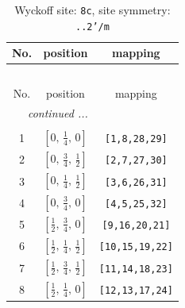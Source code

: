 \documentclass[fleqn,8pt]{jsarticle}
\begin{document}
\begin{longtable}{ccc}
\caption{Wyckoff site: {\tt 8c}, site symmetry: {\tt ..2'/m}}
 \\
 \hline \hline
No. & position & mapping \\ \hline \endfirsthead

\multicolumn{2}{l}{\tablename\ \thetable{}} \\
 \hline \hline
No. & position & mapping \\ \hline \endhead

 \hline \hline
\multicolumn{2}{r}{\footnotesize\it continued ...} \\ \endfoot

 \hline \hline
\multicolumn{2}{r}{} \\ \endlastfoot

1 & $\left[ 0,\, \frac{1}{4},\, 0 \right]$ & {\tt [1,8,28,29]} \\ \hline
2 & $\left[ 0,\, \frac{3}{4},\, \frac{1}{2} \right]$ & {\tt [2,7,27,30]} \\ \hline
3 & $\left[ 0,\, \frac{1}{4},\, \frac{1}{2} \right]$ & {\tt [3,6,26,31]} \\ \hline
4 & $\left[ 0,\, \frac{3}{4},\, 0 \right]$ & {\tt [4,5,25,32]} \\ \hline
5 & $\left[ \frac{1}{2},\, \frac{3}{4},\, 0 \right]$ & {\tt [9,16,20,21]} \\ \hline
6 & $\left[ \frac{1}{2},\, \frac{1}{4},\, \frac{1}{2} \right]$ & {\tt [10,15,19,22]} \\ \hline
7 & $\left[ \frac{1}{2},\, \frac{3}{4},\, \frac{1}{2} \right]$ & {\tt [11,14,18,23]} \\ \hline
8 & $\left[ \frac{1}{2},\, \frac{1}{4},\, 0 \right]$ & {\tt [12,13,17,24]} \\
\end{longtable}
\renewcommand{\arraystretch}{1.2}
\end{document}
